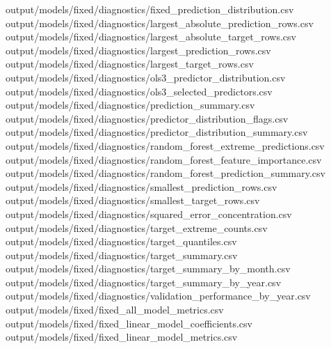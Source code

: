 \documentclass[
  11pt,
  a4paper]{article}
\newenvironment{Shaded}{}{}
\newcommand{\NormalTok}[1]{#1}
\begin{document}
\begin{Shaded}
\begin{Highlighting}[]
\NormalTok{output/models/fixed/diagnostics/fixed\_\allowbreak{}prediction\_\allowbreak{}distribution.csv}
\NormalTok{output/models/fixed/diagnostics/largest\_\allowbreak{}absolute\_\allowbreak{}prediction\_\allowbreak{}rows.csv}
\NormalTok{output/models/fixed/diagnostics/largest\_\allowbreak{}absolute\_\allowbreak{}target\_\allowbreak{}rows.csv}
\NormalTok{output/models/fixed/diagnostics/largest\_\allowbreak{}prediction\_\allowbreak{}rows.csv}
\NormalTok{output/models/fixed/diagnostics/largest\_\allowbreak{}target\_\allowbreak{}rows.csv}
\NormalTok{output/models/fixed/diagnostics/ols3\_\allowbreak{}predictor\_\allowbreak{}distribution.csv}
\NormalTok{output/models/fixed/diagnostics/ols3\_\allowbreak{}selected\_\allowbreak{}predictors.csv}
\NormalTok{output/models/fixed/diagnostics/prediction\_\allowbreak{}summary.csv}
\NormalTok{output/models/fixed/diagnostics/predictor\_\allowbreak{}distribution\_\allowbreak{}flags.csv}
\NormalTok{output/models/fixed/diagnostics/predictor\_\allowbreak{}distribution\_\allowbreak{}summary.csv}
\NormalTok{output/models/fixed/diagnostics/random\_\allowbreak{}forest\_\allowbreak{}extreme\_\allowbreak{}predictions.csv}
\NormalTok{output/models/fixed/diagnostics/random\_\allowbreak{}forest\_\allowbreak{}feature\_\allowbreak{}importance.csv}
\NormalTok{output/models/fixed/diagnostics/random\_\allowbreak{}forest\_\allowbreak{}prediction\_\allowbreak{}summary.csv}
\NormalTok{output/models/fixed/diagnostics/smallest\_\allowbreak{}prediction\_\allowbreak{}rows.csv}
\NormalTok{output/models/fixed/diagnostics/smallest\_\allowbreak{}target\_\allowbreak{}rows.csv}
\NormalTok{output/models/fixed/diagnostics/squared\_\allowbreak{}error\_\allowbreak{}concentration.csv}
\NormalTok{output/models/fixed/diagnostics/target\_\allowbreak{}extreme\_\allowbreak{}counts.csv}
\NormalTok{output/models/fixed/diagnostics/target\_\allowbreak{}quantiles.csv}
\NormalTok{output/models/fixed/diagnostics/target\_\allowbreak{}summary.csv}
\NormalTok{output/models/fixed/diagnostics/target\_\allowbreak{}summary\_\allowbreak{}by\_\allowbreak{}month.csv}
\NormalTok{output/models/fixed/diagnostics/target\_\allowbreak{}summary\_\allowbreak{}by\_\allowbreak{}year.csv}
\NormalTok{output/models/fixed/diagnostics/validation\_\allowbreak{}performance\_\allowbreak{}by\_\allowbreak{}year.csv}
\NormalTok{output/models/fixed/fixed\_\allowbreak{}all\_\allowbreak{}model\_\allowbreak{}metrics.csv}
\NormalTok{output/models/fixed/fixed\_\allowbreak{}linear\_\allowbreak{}model\_\allowbreak{}coefficients.csv}
\NormalTok{output/models/fixed/fixed\_\allowbreak{}linear\_\allowbreak{}model\_\allowbreak{}metrics.csv}

\end{Highlighting}
\end{Shaded}
\end{document}
